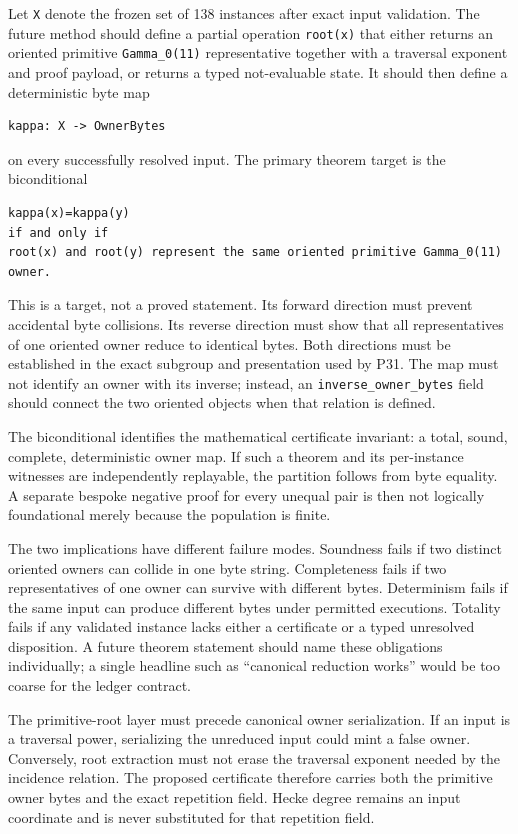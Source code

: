 \documentclass[11pt]{article}
\begin{document}
Let \texttt{X} denote the frozen set of 138 instances after exact input
validation. The future method should define a partial operation
\texttt{root(x)} that either returns an oriented primitive
\texttt{Gamma\_0(11)} representative together with a traversal exponent
and proof payload, or returns a typed not-evaluable state. It should
then define a deterministic byte map

\begin{verbatim}
kappa: X -> OwnerBytes
\end{verbatim}

on every successfully resolved input. The primary theorem target is the
biconditional

\begin{verbatim}
kappa(x)=kappa(y)
if and only if
root(x) and root(y) represent the same oriented primitive Gamma_0(11) owner.
\end{verbatim}

This is a target, not a proved statement. Its forward direction must
prevent accidental byte collisions. Its reverse direction must show that
all representatives of one oriented owner reduce to identical bytes.
Both directions must be established in the exact subgroup and
presentation used by P31. The map must not identify an owner with its
inverse; instead, an \texttt{inverse\_owner\_bytes} field should connect
the two oriented objects when that relation is defined.

The biconditional identifies the mathematical certificate invariant: a
total, sound, complete, deterministic owner map. If such a theorem and
its per-instance witnesses are independently replayable, the partition
follows from byte equality. A separate bespoke negative proof for every
unequal pair is then not logically foundational merely because the
population is finite.

The two implications have different failure modes. Soundness fails if
two distinct oriented owners can collide in one byte string. Completeness
fails if two representatives of one owner can survive with different
bytes. Determinism fails if the same input can produce different bytes
under permitted executions. Totality fails if any validated instance
lacks either a certificate or a typed unresolved disposition. A future
theorem statement should name these obligations individually; a single
headline such as ``canonical reduction works'' would be too coarse for
the ledger contract.

The primitive-root layer must precede canonical owner serialization.
If an input is a traversal power, serializing the unreduced input could
mint a false owner. Conversely, root extraction must not erase the
traversal exponent needed by the incidence relation. The proposed
certificate therefore carries both the primitive owner bytes and the
exact repetition field. Hecke degree remains an input coordinate and is
never substituted for that repetition field.
\end{document}
